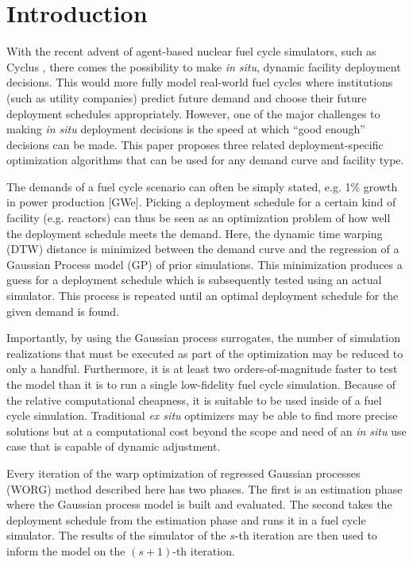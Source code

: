 \section{Introduction}
\label{intro}

With the recent advent of agent-based nuclear fuel cycle simulators, such as 
Cyclus \cite{DBLP:journals/corr/HuffGCFMOSSW15,cyclus_v1_0}, there comes the 
possibility to make \emph{in situ}, dynamic facility deployment decisions.
This  would more fully model real-world fuel cycles where institutions 
(such as utility companies)
predict future demand and choose their future deployment schedules 
appropriately. However, one of the major challenges to making \emph{in situ}
deployment decisions is the speed at which ``good enough'' decisions can 
be made. This paper proposes three related deployment-specific optimization 
algorithms that can be used for any demand curve and facility type.

The demands of a fuel cycle scenario can often be simply stated, e.g. 
1\% growth in power production [GWe]. Picking a deployment schedule for a 
certain kind of facility (e.g. reactors) can thus be seen as an optimization 
problem of how well the deployment schedule meets the demand. Here, the 
dynamic time warping (DTW) \cite{muller} distance is minimized 
between the demand curve and the regression of a Gaussian Process model (GP) 
\cite{rasmussen2006gaussian} of prior simulations. This minimization produces
a guess for a deployment schedule which is subsequently tested using 
an actual simulator. This process is repeated until an optimal deployment
schedule for the given demand is found.

Importantly, by using the Gaussian process surrogates, the number of 
simulation realizations that must be executed as part of the optimization may 
be reduced to only a handful. Furthermore, it is at least two 
orders-of-magnitude faster to test the model than it is to run a single
low-fidelity fuel cycle simulation. Because of the relative computational 
cheapness, it 
is suitable to be used inside of a fuel cycle simulation. Traditional
\emph{ex situ} optimizers may be able to find more precise solutions but at a
computational cost beyond the scope and need of an \emph{in situ} use case
that is capable of dynamic adjustment.

Every iteration of the warp optimization of regressed Gaussian processes (WORG) 
method described here has two phases. The first is an estimation phase where 
the Gaussian process model is built and evaluated. The second takes the 
deployment schedule from the estimation phase and runs it in a fuel cycle 
simulator. The results of the simulator of the $s$-th iteration are then 
used to inform the model on the $(s+1)$-th iteration. 

